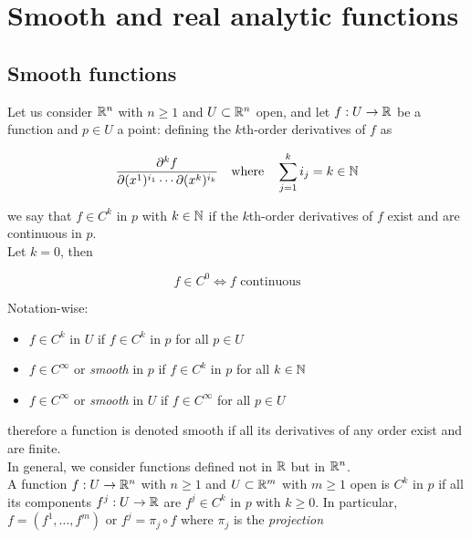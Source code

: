 \section{Smooth and real analytic functions}

\subsection{Smooth functions}

Let us consider $ \mathbb{R}^{n} $ with $ n \geqslant 1 $ and $ U \subset \mathbb{R}^{n} $ open, and let $ f : U \to \mathbb{R} $ be a function and $ p \in U $ a point: defining the $ k $th-order derivatives of $ f $ as

\begin{equation}
	\dfrac{\partial^{k} f}{\partial (x^{1})^{i_{1}} \cdots \partial (x^{k})^{i_{k}}} %
	\qq{where} \sum_{j=1}^{k} i_{j} = k \in \N
\end{equation}

we say that $ f \in C^{k} $ in $ p $ with $ k \in \mathbb{N} $ if the $ k $th-order derivatives of $ f $ exist and are continuous in $ p $. \\
Let $ k = 0 $, then

\begin{equation}
	f \in C^{0} \iff f \text{ continuous}
\end{equation}

Notation-wise:

\begin{itemize}
	\item $ f \in C^{k} $ in $ U $ if $ f \in C^{k} $ in $ p $ for all $ p \in U $
	
	\item $ f \in C^{\infty} $ or \textit{smooth} in $ p $ if $ f \in C^{k} $ in $ p $ for all $ k \in \mathbb{N} $
	
	\item $ f \in C^{\infty} $ or \textit{smooth} in $ U $ if $ f \in C^{\infty} $ for all $ p \in U $
\end{itemize}

therefore a function is denoted smooth if all its derivatives of any order exist and are finite. \\
In general, we consider functions defined not in $ \mathbb{R} $ but in $ \mathbb{R}^{n} $. \\
A function $ f : U \to \mathbb{R}^{n} $ with $ n \geqslant 1 $ and $ U \subset \mathbb{R}^{m} $ with $ m \geqslant 1 $ open is $ C^{k} $ in $ p $ if all its components $ f^{j} : U \to \mathbb{R} $ are $ f^{j} \in C^{k} $ in $ p $ with $ k \geqslant 0 $. In particular, $ f = (f^{1}, \dots, f^{m}) $ or $ f^{j} = \pi_{j} \circ f $ where $ \pi_{j} $ is the \textit{projection}

